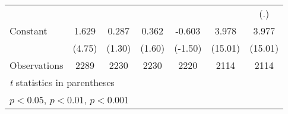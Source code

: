 \begin{table}[htbp]
\begin{tabular}{l*{6}{c}}
                    &                     &                     &                     &                     &                     &         (.)         \\
[1em]
Constant            &       1.629\sym{***}&       0.287         &       0.362         &      -0.603         &       3.978\sym{***}&       3.977\sym{***}\\
                    &      (4.75)         &      (1.30)         &      (1.60)         &     (-1.50)         &     (15.01)         &     (15.01)         \\
\hline
Observations        &        2289         &        2230         &        2230         &        2220         &        2114         &        2114         \\
\hline\hline
\multicolumn{7}{l}{\footnotesize \textit{t} statistics in parentheses}\\
\multicolumn{7}{l}{\footnotesize \sym{*} \(p<0.05\), \sym{**} \(p<0.01\), \sym{***} \(p<0.001\)}\\
\end{tabular}
\end{table}
